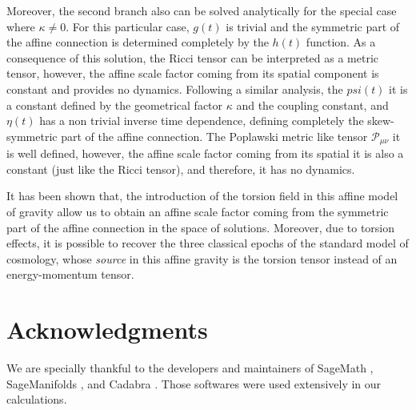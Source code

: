 Moreover, the second branch also can be solved analytically for the special case where $\kappa \neq 0$. 
For this particular case, $g(t)$ is trivial and the symmetric part of the affine connection is
determined completely by the $h(t)$ function. As a consequence of this solution, the Ricci tensor
can be interpreted as a metric tensor, however, the affine scale factor coming from its spatial 
component is constant and provides no dynamics. Following a similar analysis, the $psi(t)$ it is
a constant defined by the geometrical factor $\kappa$ and the coupling constant, and
$\eta(t)$ has a non trivial inverse time dependence, defining completely the skew-symmetric part
of the affine connection. The Poplawski metric like tensor $\mathcal{P}_{\mu\nu}$ it is well defined,
however, the affine scale factor coming from its spatial it is also a constant (just like the Ricci
tensor), and therefore, it has no dynamics.


It has been shown that, the introduction of the torsion field in this affine model of gravity
allow us to obtain an affine scale factor coming from the symmetric part of the affine connection
in the space of solutions. Moreover, due to torsion effects, it is possible to recover the 
three classical epochs of the standard model of cosmology, whose \textit{source} in this affine gravity 
is the torsion tensor instead of an energy-momentum tensor.


\section{Acknowledgments}

We are specially thankful to the developers and maintainers of SageMath \cite{sagemath}, SageManifolds 
\cite{Gourgoulhon_2015,Gourgoulhon_2018}, and Cadabra \cite{peeters2018introducing,Peeters2018,Peeters_2007}. Those softwares were 
used extensively in our calculations.









